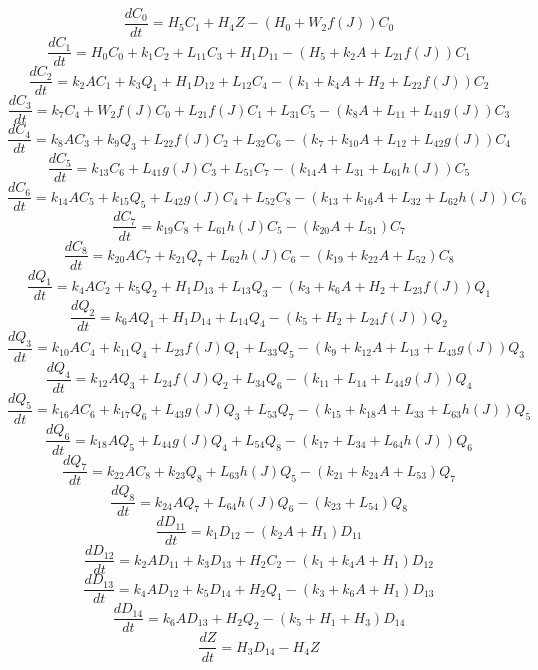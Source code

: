 \[\dfrac{dC_{0}}{dt}=H_{5}C_{1}+H_{4}Z-\left(H_{0}+W_{2}f\left(J\right)\right)C_{0}\]
\[\dfrac{dC_{1}}{dt}=H_{0}C_{0}+k_{1}C_{2}+L_{11}C_{3}+H_{1}D_{11}-\left(H_{5}+k_{2}A+L_{21}f\left(J\right)\right)C_{1}\]
\[\dfrac{dC_{2}}{dt}=k_{2}AC_{1}+k_{3}Q_{1}+H_{1}D_{12}+L_{12}C_{4}-\left(k_{1}+k_{4}A+H_{2}+L_{22}f\left(J\right)\right)C_{2}\]
\[\dfrac{dC_{3}}{dt}=k_{7}C_{4}+W_{2}f\left(J\right)C_{0}+L_{21}f\left(J\right)C_{1}+L_{31}C_{5}-\left(k_{8}A+L_{11}+L_{41}g\left(J\right)\right)C_{3}\]
\[\dfrac{dC_{4}}{dt}=k_{8}AC_{3}+k_{9}Q_{3}+L_{22}f\left(J\right)C_{2}+L_{32}C_{6}-\left(k_{7}+k_{10}A+L_{12}+L_{42}g\left(J\right)\right)C_{4}\]
\[\dfrac{dC_{5}}{dt}=k_{13}C_{6}+L_{41}g\left(J\right)C_{3}+L_{51}C_{7}-\left(k_{14}A+L_{31}+L_{61}h\left(J\right)\right)C_{5}\]
\[\dfrac{dC_{6}}{dt}=k_{14}AC_{5}+k_{15}Q_{5}+L_{42}g\left(J\right)C_{4}+L_{52}C_{8}-\left(k_{13}+k_{16}A+L_{32}+L_{62}h\left(J\right)\right)C_{6}\]
\[\dfrac{dC_{7}}{dt}=k_{19}C_{8}+L_{61}h\left(J\right)C_{5}-\left(k_{20}A+L_{51}\right)C_{7}\]
\[\dfrac{dC_{8}}{dt}=k_{20}AC_{7}+k_{21}Q_{7}+L_{62}h\left(J\right)C_{6}-\left(k_{19}+k_{22}A+L_{52}\right)C_{8}\]
\[\dfrac{dQ_{1}}{dt}=k_{4}AC_{2}+k_{5}Q_{2}+H_{1}D_{13}+L_{13}Q_{3}-\left(k_{3}+k_{6}A+H_{2}+L_{23}f\left(J\right)\right)Q_{1}\]
\[\dfrac{dQ_{2}}{dt}=k_{6}AQ_{1}+H_{1}D_{14}+L_{14}Q_{4}-\left(k_{5}+H_{2}+L_{24}f\left(J\right)\right)Q_{2}\]
\[\dfrac{dQ_{3}}{dt}=k_{10}AC_{4}+k_{11}Q_{4}+L_{23}f\left(J\right)Q_{1}+L_{33}Q_{5}-\left(k_{9}+k_{12}A+L_{13}+L_{43}g\left(J\right)\right)Q_{3}\]
\[\dfrac{dQ_{4}}{dt}=k_{12}AQ_{3}+L_{24}f\left(J\right)Q_{2}+L_{34}Q_{6}-\left(k_{11}+L_{14}+L_{44}g\left(J\right)\right)Q_{4}\]
\[\dfrac{dQ_{5}}{dt}=k_{16}AC_{6}+k_{17}Q_{6}+L_{43}g\left(J\right)Q_{3}+L_{53}Q_{7}-\left(k_{15}+k_{18}A+L_{33}+L_{63}h\left(J\right)\right)Q_{5}\]
\[\dfrac{dQ_{6}}{dt}=k_{18}AQ_{5}+L_{44}g\left(J\right)Q_{4}+L_{54}Q_{8}-\left(k_{17}+L_{34}+L_{64}h\left(J\right)\right)Q_{6}\]
\[\dfrac{dQ_{7}}{dt}=k_{22}AC_{8}+k_{23}Q_{8}+L_{63}h\left(J\right)Q_{5}-\left(k_{21}+k_{24}A+L_{53}\right)Q_{7}\]
\[\dfrac{dQ_{8}}{dt}=k_{24}AQ_{7}+L_{64}h\left(J\right)Q_{6}-\left(k_{23}+L_{54}\right)Q_{8}\]
\[\dfrac{dD_{11}}{dt}=k_{1}D_{12}-\left(k_{2}A+H_{1}\right)D_{11}\]
\[\dfrac{dD_{12}}{dt}=k_{2}AD_{11}+k_{3}D_{13}+H_{2}C_{2}-\left(k_{1}+k_{4}A+H_{1}\right)D_{12}\]
\[\dfrac{dD_{13}}{dt}=k_{4}AD_{12}+k_{5}D_{14}+H_{2}Q_{1}-\left(k_{3}+k_{6}A+H_{1}\right)D_{13}\]
\[\dfrac{dD_{14}}{dt}=k_{6}AD_{13}+H_{2}Q_{2}-\left(k_{5}+H_{1}+H_{3}\right)D_{14}\]
\[\dfrac{dZ}{dt}=H_{3}D_{14}-H_{4}Z\]
